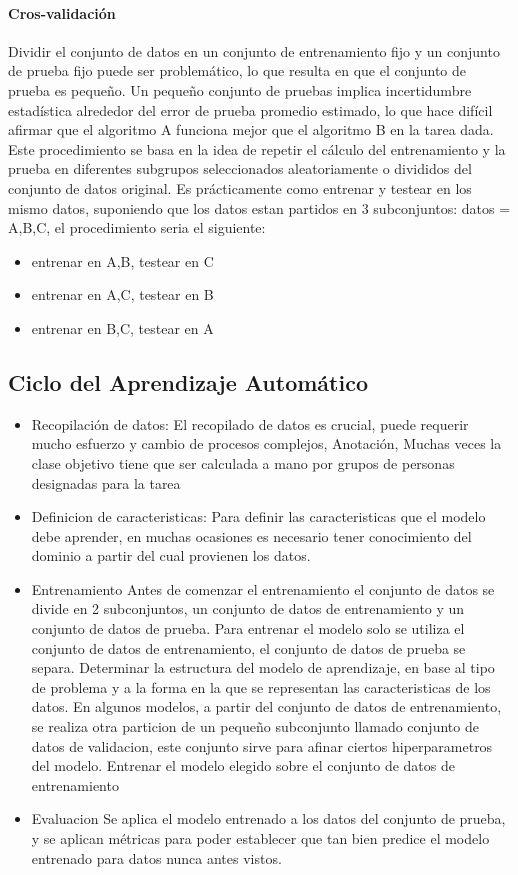 \documentclass[a4paper,11pt,spanish]{book}
\begin{document}
	\paragraph {Cros-validación}
	  Dividir el conjunto de datos en un conjunto de entrenamiento fijo y un conjunto de prueba fijo puede ser problemático, lo que resulta en que el conjunto de prueba es pequeño. 
	  Un pequeño conjunto de pruebas implica incertidumbre estadística alrededor del error de prueba promedio estimado, lo que hace difícil afirmar que el algoritmo A funciona mejor que el algoritmo B en la tarea dada.
	  Este procedimiento se basa en la idea de repetir el cálculo del entrenamiento y la prueba en diferentes subgrupos seleccionados aleatoriamente o divididos del conjunto de datos original.
	  Es prácticamente como entrenar y testear en los mismo datos, suponiendo que los datos estan partidos en 3 subconjuntos: datos = {A,B,C}, el procedimiento seria el siguiente:
	  \begin{itemize}
	    \item entrenar en A,B, testear en C
	    \item entrenar en A,C, testear en B
	    \item entrenar en B,C, testear en A
	  \end{itemize}

    \subsection{Ciclo del Aprendizaje Automático}
      \begin{itemize}
	\item Recopilación de datos:
	  El recopilado de datos es crucial, puede requerir mucho esfuerzo y cambio de procesos complejos, 
	  Anotación, Muchas veces la clase objetivo tiene que ser calculada a mano por grupos de personas designadas para la tarea
	\item Definicion de caracteristicas: Para definir las caracteristicas que el modelo debe aprender, en muchas ocasiones es necesario tener conocimiento del dominio a partir del cual provienen los datos. 
	\item Entrenamiento
	  \subitem Antes de comenzar el entrenamiento el conjunto de datos se divide en 2 subconjuntos, un conjunto de datos de entrenamiento y un conjunto de datos de prueba. 
	  \subitem Para entrenar el modelo solo se utiliza el conjunto de datos de entrenamiento, el conjunto de datos de prueba se separa.
	  \subitem Determinar la estructura del modelo de aprendizaje, en base al tipo de problema y a la forma en la que se representan las caracteristicas de los datos.
	  \subitem En algunos modelos, a partir del conjunto de datos de entrenamiento, se realiza otra particion de un pequeño subconjunto llamado conjunto de datos de validacion, este conjunto sirve 
	  para afinar ciertos hiperparametros del modelo.
	  \subitem Entrenar el modelo elegido sobre el conjunto de datos de entrenamiento
	\item Evaluacion
	  Se aplica el modelo entrenado a los datos del conjunto de prueba, y se aplican métricas para poder establecer que tan bien predice el modelo entrenado para datos nunca antes vistos.
      \end{itemize}
    
\end{document}
